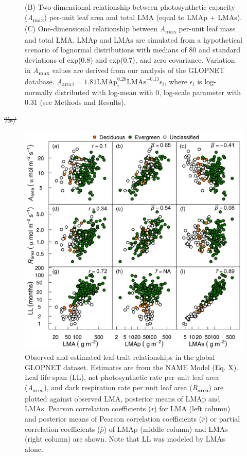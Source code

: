 \documentclass[
  12pt,
]{article}
\providecommand{\DIFdeltex}[1]{{\protect\color{red}\sout{#1}}}                      %
\providecommand{\DIFaddbegin}{} %
\providecommand{\DIFdelbegin}{} %
\providecommand{\DIFdelend}{} %
\providecommand{\DIFaddendFL}{} %
\providecommand{\DIFdel}[1]{\texorpdfstring{\DIFdeltex{#1}}{}} %
\newcommand{\DIFscaledelfig}{0.5}
\newlength{\DIFdelgraphicswidth} %
\newlength{\DIFdelgraphicsheight} %
\newcommand{\DIFaddincludegraphics}[2][]{{\color{blue}\fbox{\DIFOincludegraphics[#1]{#2}}}} %
\newcommand{\DIFdelincludegraphics}[2][]{%
\sbox{\DIFdelgraphicsbox}{\DIFOincludegraphics[#1]{#2}}%
\settoboxwidth{\DIFdelgraphicswidth}{\DIFdelgraphicsbox} %
\settoboxtotalheight{\DIFdelgraphicsheight}{\DIFdelgraphicsbox} %
\scalebox{\DIFscaledelfig}{%
\parbox[b]{\DIFdelgraphicswidth}{\usebox{\DIFdelgraphicsbox}\\[-\baselineskip] \rule{\DIFdelgraphicswidth}{0em}}\llap{\resizebox{\DIFdelgraphicswidth}{\DIFdelgraphicsheight}{%
\setlength{\unitlength}{\DIFdelgraphicswidth}%
\begin{picture}(1,1)%
\thicklines\linethickness{2pt} %
{\color[rgb]{1,0,0}\put(0,0){\framebox(1,1){}}}%
{\color[rgb]{1,0,0}\put(0,0){\line( 1,1){1}}}%
{\color[rgb]{1,0,0}\put(0,1){\line(1,-1){1}}}%
\end{picture}%
}\hspace*{3pt}}} %
} %
\DeclareRobustCommand{\DIFaddbegin}{\DIFOaddbegin \let\includegraphics\DIFaddincludegraphics} %
\DeclareRobustCommand{\DIFdelbegin}{\DIFOdelbegin \let\includegraphics\DIFdelincludegraphics} %
\DeclareRobustCommand{\DIFdelend}{\DIFOaddend \let\includegraphics\DIFOincludegraphics} %
\DeclareRobustCommand{\DIFaddendFL}{\DIFOaddendFL \let\includegraphics\DIFOincludegraphics} %
\begin{document}
\begin{figure}
{{(B) Two-dimensional relationship between photosynthetic capacity (\emph{A}\textsubscript{max}) per-unit leaf area and total LMA (equal to LMAp + LMAs).
(C) One-dimensional relationship between \emph{A}\textsubscript{max} per-unit leaf mass and total LMA.
LMAp and LMAs are simulated from a hypothetical scenario of lognormal distributions with medians of 80 and standard deviations of exp(0.8) and exp(0.7), and zero covariance.
Variation in \emph{A}\textsubscript{max} values are derived from our analysis of the GLOPNET database. \(A_{\mathrm{area} \, i}=1.81\mathrm{LMAp}_i^{0.28}\mathrm{LMAs}^{-0.13}\epsilon_i\), where \(\epsilon_i\) is log-normally distributed with log-mean with 0, log-scale parameter with 0.31 (see Methods and Results).}\label{fig:Hplt}
}
\DIFaddendFL \end{figure}

\DIFdelbegin \DIFdel{\%s/}\DIFdelend \DIFaddbegin \begin{figure}
\hypertarget{fig:GLplt}{%
\centering
\includegraphics{../figs/GL_scatter.png}
\caption{Observed and estimated leaf-trait relationships in the global GLOPNET dataset.
Estimates are from the NAME Model (Eq. X).
Leaf life span (LL), net photosynthetic rate per unit leaf area (\emph{A}\textsubscript{area}), and dark respiration rate per unit leaf area (\emph{R}\textsubscript{area}) are plotted against observed LMA, posterior means of LMAp and LMAs.
Pearson correlation coefficients (\emph{r}) for LMA (left column) and posterior means of Pearson correlation coefficients (\(\bar{r}\)) or partial correlation coefficients (\(\bar{\rho}\)) of LMAp (middle column) and LMAs (right column) are shown.
Note that LL was modeled by LMAs alone.}\label{fig:GLplt}
}
\end{figure}
\end{document}
